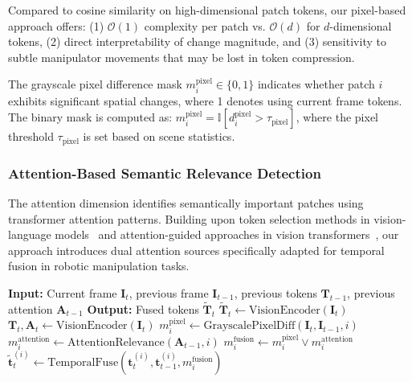 \documentclass[letterpaper]{article}
\begin{document}
Compared to cosine similarity on high-dimensional patch tokens, our pixel-based approach offers: (1) $\mathcal{O}(1)$ complexity per patch vs. $\mathcal{O}(d)$ for $d$-dimensional tokens, (2) direct interpretability of change magnitude, and (3) sensitivity to subtle manipulator movements that may be lost in token compression.

The grayscale pixel difference mask $m_i^{\text{pixel}} \in \{0,1\}$ indicates whether patch $i$ exhibits significant spatial changes, where 1 denotes using current frame tokens. The binary mask is computed as: $m_i^{\text{pixel}} = \mathbb{I}\!\left[d_i^{\text{pixel}} > \tau_{\text{pixel}}\right]$, where the pixel threshold $\tau_{\text{pixel}}$ is set based on scene statistics.


\subsubsection{Attention-Based Semantic Relevance Detection}

The attention dimension identifies semantically important patches using transformer attention patterns. Building upon token selection methods in vision-language models~\cite{chen2024image,zhang2024sparsevlm} and attention-guided approaches in vision transformers~\cite{dynamicvit2021,adavit2022,evit2022,tome2023,xu2025vla}, our approach introduces dual attention sources specifically adapted for temporal fusion in robotic manipulation tasks.

\begin{algorithm}
\caption{Temporal Token Fusion}
\begin{algorithmic}
\STATE \textbf{Input:} Current frame $\mathbf{I}_t$, previous frame $\mathbf{I}_{t-1}$, previous tokens $\mathbf{T}_{t-1}$, previous attention $\mathbf{A}_{t-1}$
\STATE \textbf{Output:} Fused tokens $\tilde{\mathbf{T}}_t$
    \STATE $\tilde{\mathbf{T}}_t \leftarrow \text{VisionEncoder}(\mathbf{I}_t)$
\ELSE
    \STATE $\mathbf{T}_t, \mathbf{A}_t \leftarrow \text{VisionEncoder}(\mathbf{I}_t)$ 
        \STATE $m_i^{\text{pixel}} \leftarrow \text{GrayscalePixelDiff}(\mathbf{I}_t, \mathbf{I}_{t-1}, i)$
        \STATE $m_i^{\text{attention}} \leftarrow \text{AttentionRelevance}(\mathbf{A}_{t-1}, i)$
        \STATE $m_i^{\text{fusion}} \leftarrow m_i^{\text{pixel}} \lor m_i^{\text{attention}}$
        \STATE $\tilde{\mathbf{t}}_t^{(i)} \leftarrow \text{TemporalFuse}(\mathbf{t}_t^{(i)}, \mathbf{t}_{t-1}^{(i)}, m_i^{\text{fusion}})$
    \ENDFOR
\ENDIF
\end{algorithmic}
\end{algorithm}
\end{document}
